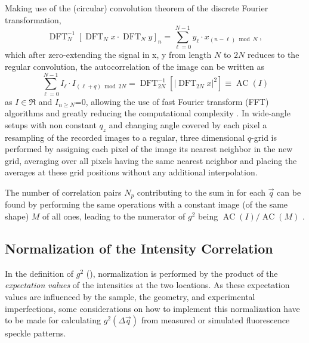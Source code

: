 Making use of the (circular) convolution theorem of the discrete Fourier transformation,
\begin{equation}
	\operatorname{DFT}_N^{-1}\left[\operatorname{DFT}_N x \cdot \operatorname{DFT}_N y\right]_n=\sum_{\ell=0}^{N-1} y_{\ell} \cdot x_{(n-\ell) \bmod N} \,,
\end{equation}
which after zero-extending the signal in x, y from length $N$ to $2N$ reduces to the regular convolution, the autocorrelation of the image can be written as 
\begin{equation}
	\sum_{\ell=0}^{N-1} I_{\ell} \cdot I_{(\ell+q) \bmod 2N}=\operatorname{DFT}_{2N}^{-1}\left[\left|\operatorname{DFT}_{2N} {x}\right|^2\right]\equiv \operatorname{AC}(I)
	\label{eq:fftcorrelation}
\end{equation} 
as $I\in \Re$ and $I_{n\geq N}$=0, allowing the use of fast Fourier transform (FFT) algorithms and greatly reducing the computational complexity \cite{oppenheim2009}.  In wide-angle setups with non constant $q_z$ and changing angle covered by each pixel a resampling of the recorded images to a regular, three dimensional $q$-grid is performed by assigning each pixel of the image its nearest neighbor in the new grid, averaging over all pixels having the same nearest neighbor and placing the averages at these grid positions without any additional interpolation. 

The number of correlation pairs $N_p$ contributing to the sum in  for each $\vec{q}$ can be found by performing the same operations with a constant image (of the same shape) $M$ of all ones, leading to the numerator of $g^2$ being $\operatorname{AC}(I)/\operatorname{AC}(M)$ \cite{oppenheim2009,butz2015,nion2008}.

\subsection{Normalization of the Intensity Correlation}
\label{sec:normal}
In the definition of $g^2$ (), normalization is performed by the product of the \textit{expectation values} of the intensities at the two locations. As these expectation values are influenced by the sample, the geometry, and experimental imperfections, some considerations on how to implement this normalization have to be made for calculating $g^2(\Delta\vec{q})$ from measured or simulated fluorescence speckle patterns. 

